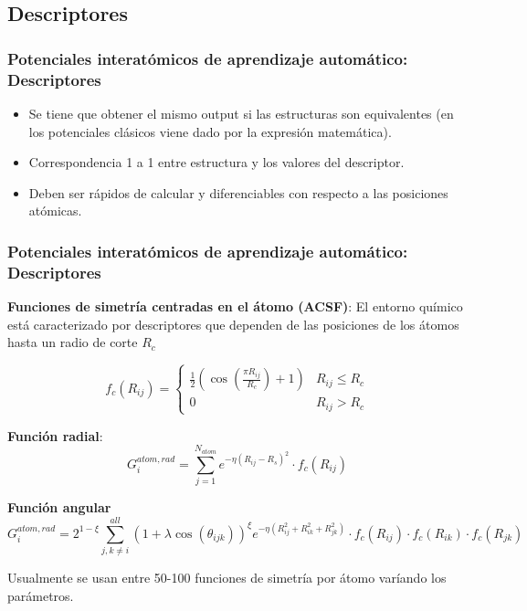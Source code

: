 \documentclass[aspectratio=169]{beamer}
\let\oldtextbf\textbf
\renewcommand{\textbf}[1]{\textcolor{nordblue}{\oldtextbf{#1}}}
\begin{document}
    \subsection{Descriptores}
    \begin{frame}
        \frametitle{Potenciales interatómicos de aprendizaje automático: Descriptores}
        
        \begin{itemize}
            \item Se tiene que obtener el mismo output si las estructuras son 
                equivalentes (en los potenciales clásicos viene dado por la 
                expresión matemática).
            \item Correspondencia 1 a 1 entre estructura y los valores del 
                descriptor.
            \item Deben ser rápidos de calcular y diferenciables con respecto a 
                las posiciones atómicas.
        \end{itemize}

    \end{frame}

    \begin{frame}
        \frametitle{Potenciales interatómicos de aprendizaje automático: Descriptores}

        \textbf{Funciones de simetría centradas en el átomo (ACSF)}: El entorno
        químico está caracterizado por descriptores que dependen de las posiciones
        de los átomos hasta un radio de corte $R_c$


        \[ f_c(R_{ij}) = 
            \begin{cases}
                \frac{1}{2}\left( \cos\left(\frac{\pi R_{ij}}{R_c}\right) + 1 \right) & R_{ij} \leq R_c \\
                0 & R_{ij} > R_c
            \end{cases}
        \]
        
        \pause

        \textbf{Función radial}:
        $$
        G_i^{atom,rad} = \sum_{j=1}^{N_{atom}} e^{- \eta (R_{ij} - R_s)^2} \cdot f_c(R_{ij})
        $$

        \textbf{Función angular}
        $$
        G_i^{atom,rad} = 2^{1-\xi}  \sum_{j,k \neq i}^{all} (1 + \lambda \cos(\theta_{ijk}))^{\xi} e^{- \eta (R_{ij}^2 + R_{ik}^2 + R_{jk}^2)} \cdot f_c(R_{ij}) \cdot f_c(R_{ik}) \cdot f_c(R_{jk})
        $$

        \pause

        Usualmente se usan entre 50-100 funciones de simetría por átomo varíando
        los parámetros.
    
    \end{frame}
    
\end{document}
